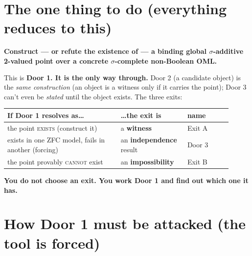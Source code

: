 \documentclass[9pt]{extarticle}
\begin{document}
\section*{The one thing to do (everything reduces to this)}

\begin{door}
\centering\bfseries
Construct --- or refute the existence of --- a binding global $\sigma$-additive
2-valued point over a concrete $\sigma$-complete non-Boolean OML.
\end{door}

This is \textbf{Door 1. It is the only way through.} Door 2 (a candidate object) is the
\emph{same construction} (an object is a witness only if it carries the point); Door 3
can't even be \emph{stated} until the object exists. The three exits:

\begin{center}
\begin{tabular}{@{}p{0.46\linewidth}p{0.27\linewidth}p{0.18\linewidth}@{}}
\toprule
\textbf{If Door 1 resolves as\ldots} & \textbf{\ldots the exit is} & \textbf{name} \\
\midrule
the point \textsc{exists} (construct it) & a \textbf{witness} & Exit A \\
exists in one ZFC model, fails in another (forcing) & an \textbf{independence} result & Door 3 \\
the point provably \textsc{cannot} exist & an \textbf{impossibility} & Exit B \\
\bottomrule
\end{tabular}
\end{center}

\textbf{You do not choose an exit. You work Door 1 and find out which one it has.}

\section*{How Door 1 must be attacked (the tool is forced)}
\end{document}
